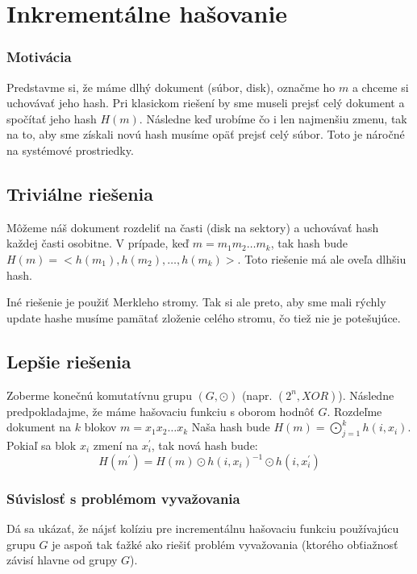 \section{Inkrementálne hašovanie}

\subsubsection{Motivácia}

Predstavme si, že máme dlhý dokument (súbor, disk),
označme ho $m$ a chceme si uchovávať jeho hash. Pri klasickom riešení
by sme museli prejsť celý dokument a spočítať jeho 
hash $H(m)$. Následne keď urobíme čo i len najmenšiu
zmenu, tak na to, aby sme získali novú hash musíme opäť
prejsť celý súbor. Toto je náročné na systémové prostriedky.

\subsection{Triviálne riešenia}

Môžeme náš dokument rozdeliť na časti (disk na sektory)
a uchovávať hash každej časti osobitne. V prípade, keď
$m = m_1 m_2 \dots m_k$, tak hash bude 
$H(m) = <h(m_1), h(m_2), \dots, h(m_k)>$.
Toto riešenie má ale oveľa dlhšiu hash.

Iné riešenie je použiť Merkleho stromy. Tak si ale preto, aby
sme mali rýchly update hashe musíme pamätať zloženie celého stromu, čo tiež nie je potešujúce.


\subsection{Lepšie riešenia}

Zoberme konečnú komutatívnu grupu $(G, \odot)$ (napr. $(2^n, XOR)$).
Následne predpokladajme, že máme hašovaciu funkciu s oborom hodnôť $G$.
Rozdeľme dokument na $k$ blokov $m = x_1 x_2 \dots x_k$ Naša hash bude 
$H(m) = \displaystyle\bigodot_{j=1}^k h(i, x_i)$. 
Pokiaľ sa blok $x_i$ zmení na $x_i^{'}$, tak nová hash bude:
$$H(m^{'}) = H(m) \odot h(i, x_i)^{-1} \odot h(i, x_i^{'})$$

\subsubsection{Súvislosť s problémom vyvažovania}

Dá sa ukázať, že nájsť kolíziu pre incrementálnu hašovaciu
funkciu používajúcu grupu $G$ je aspoň tak ťažké ako riešiť
problém vyvažovania (ktorého obťiažnosť závisí hlavne od grupy 
$G$).

